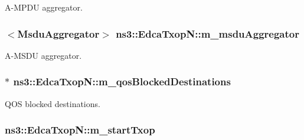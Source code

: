 A-\/\+M\+P\+DU aggregator. 

\subsubsection[{\texorpdfstring{m\+\_\+msdu\+Aggregator}{m_msduAggregator}}]{$<${\bf Msdu\+Aggregator}$>$ ns3\+::\+Edca\+Txop\+N\+::m\+\_\+msdu\+Aggregator\hspace{0.3cm}{\ttfamily [private]}}\hypertarget{classns3_1_1EdcaTxopN_ab4ec029e40b068965e1c7e80b1750027}{}\label{classns3_1_1EdcaTxopN_ab4ec029e40b068965e1c7e80b1750027}


A-\/\+M\+S\+DU aggregator. 

\subsubsection[{\texorpdfstring{m\+\_\+qos\+Blocked\+Destinations}{m_qosBlockedDestinations}}]{$\ast$ ns3\+::\+Edca\+Txop\+N\+::m\+\_\+qos\+Blocked\+Destinations\hspace{0.3cm}{\ttfamily [private]}}\hypertarget{classns3_1_1EdcaTxopN_a11581df9860f137e60b71cefd399e8b8}{}\label{classns3_1_1EdcaTxopN_a11581df9860f137e60b71cefd399e8b8}


Q\+OS blocked destinations. 

\subsubsection[{\texorpdfstring{m\+\_\+start\+Txop}{m_startTxop}}]{ ns3\+::\+Edca\+Txop\+N\+::m\+\_\+start\+Txop\hspace{0.3cm}{\ttfamily [private]}}\hypertarget{classns3_1_1EdcaTxopN_a09db5c98febe1b5ecd67574518c67b2a}{}\label{classns3_1_1EdcaTxopN_a09db5c98febe1b5ecd67574518c67b2a}


